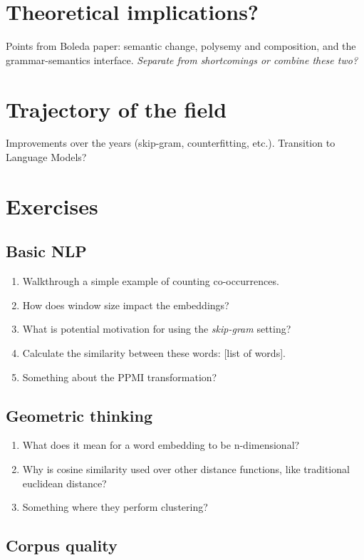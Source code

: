 \section{Theoretical implications?}
Points from Boleda paper: semantic change, polysemy and composition, and the grammar-semantics interface.
\textit{Separate from shortcomings or combine these two?}

\section{Trajectory of the field}
Improvements over the years (skip-gram, counterfitting, etc.).
Transition to Language Models?

\section{Exercises}

\subsection{Basic NLP}

\begin{enumerate}
\item Walkthrough a simple example of counting co-occurrences.
\item How does window size impact the embeddings?
\item What is potential motivation for using the \textit{skip-gram} setting?
\item Calculate the similarity between these words: [list of words]. 
\item Something about the PPMI transformation?
\end{enumerate}

\subsection{Geometric thinking}

\begin{enumerate}
\item What does it mean for a word embedding to be n-dimensional?
\item Why is cosine similarity used over other distance functions, like traditional euclidean distance?
\item Something where they perform clustering?
\end{enumerate}

\subsection{Corpus quality}

